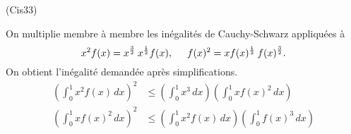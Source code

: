\begin{tiny}(Cis33)\end{tiny} On multiplie membre à membre les inégalités de Cauchy-Schwarz appliquées à 
\[
 x^2 f(x) = x^{\frac{3}{2}}\:x^{\frac{1}{2}}f(x),\hspace{0.5cm} f(x)^2 = xf(x)^{\frac{1}{2}}\: f(x)^{\frac{3}{2}}.
\]
On obtient l'inégalité demandée après simplifications.
\begin{align*}
 \left( \int_{0}^{1}x^2 f(x)\,dx\right)^2 &\leq \left( \int_0^{1}x^3\,dx\right) \left( \int_0^{1}xf(x)^2\,dx\right) \\ 
 \left( \int_{0}^{1}x f(x)^2\,dx\right)^2 &\leq \left( \int_0^{1}x^2 f(x)\,dx\right) \left( \int_0^{1}f(x)^3\,dx\right)
\end{align*}
